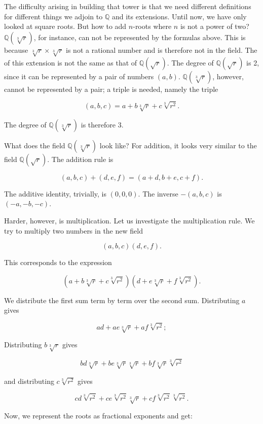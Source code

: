 \documentclass[tikz]{scrreprt}
\begin{document}
The difficulty arising in building that tower
is that we need different definitions for different
things we adjoin to $\mathbb{Q}$ and its extensions.
Until now, we have only looked at square roots.
But how to add $n$-roots where $n$ is not a power of two?
$\mathbb{Q}(\sqrt[3]{r})$, for instance, can not be represented
by the formulas above.
This is because $\sqrt[3]{r} \times \sqrt[3]{r}$
is not a rational number and is therefore not in the field.
The  of this extension is not the same as that of
$\mathbb{Q}(\sqrt{r})$.
The degree of 
$\mathbb{Q}(\sqrt{r})$ is 2, since it can be represented by a pair of numbers
$(a,b)$.
$\mathbb{Q}(\sqrt[3]{r})$, however, cannot be represented by a pair;
a triple is needed, namely the triple

\[
(a,b,c) = a + b\sqrt[3]{r} + c\sqrt[3]{r^2}.
\]

The degree of $\mathbb{Q}(\sqrt[3]{r})$ is therefore 3.

What does the field $\mathbb{Q}(\sqrt[3]{r})$ look like?
For addition, it looks very similar to the field $\mathbb{Q}(\sqrt{r})$.
The addition rule is

\begin{equation}\label{fieldExtAdd3}
(a,b,c) + (d,e,f) = (a+d,b+e,c+f).
\end{equation}

The additive identity, trivially, is $(0,0,0)$.
The inverse $-(a,b,c)$ is $(-a,-b,-c)$.

Harder, however, is multiplication.
Let us investigate the multiplication rule.
We try to multiply two numbers in the new field

\[
(a,b,c)(d,e,f).
\]

This corresponds to the expression

\[
(a+b\sqrt[3]{r}+c\sqrt[3]{r^2})
(d+e\sqrt[3]{r}+f\sqrt[3]{r^2}).
\]

We distribute the first sum term by term
over the second sum.
Distributing $a$ gives

\[
ad+ae\sqrt[3]{r}+af\sqrt[3]{r^2};
\]

Distributing $b\sqrt[3]{r}$ gives

\[
bd\sqrt[3]{r}+be\sqrt[3]{r}\sqrt[3]{r}+bf\sqrt[3]{r}\sqrt[3]{r^2}
\]

and distributing $c\sqrt[3]{r^2}$ gives

\[
cd\sqrt[3]{r^2}+ce\sqrt[3]{r^2}\sqrt[3]{r}+cf\sqrt[3]{r^2}\sqrt[3]{r^2}.
\]

Now, we represent the roots as fractional exponents and get:
\end{document}
